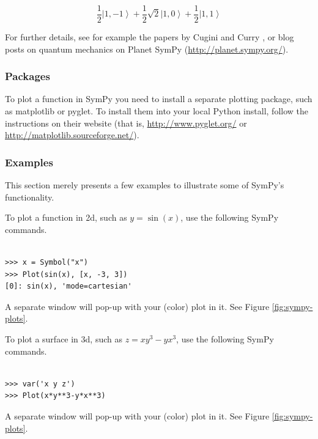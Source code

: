 \documentclass[12pt]{article}
\begin{document}
\[
\frac{1}{2} {\left|1,-1\right\rangle } + \frac{1}{2} \sqrt{2} {\left|1,0\right
\rangle } + \frac{1}{2} {\left|1,1\right\rangle }
\]

For further details, see for example the papers by Cugini \cite{Cug}
and Curry \cite{Cur}, or blog posts on quantum mechanics on 
Planet SymPy (\url{http://planet.sympy.org/}).

\subsubsection{Packages}

To plot a function in SymPy you need to install a separate plotting
package, such as matplotlib or pyglet.
To install them into your local Python install, follow the
instructions on their website (that is,
\url{http://www.pyglet.org/} or
\url{http://matplotlib.sourceforge.net/}).

\subsubsection{Examples}

This section merely presents a few examples to illustrate some of 
SymPy's functionality.

To plot a function in 2d, such as $y=\sin(x)$,
use the following SymPy commands.

\begin{Verbatim}[fontsize=\scriptsize,fontfamily=courier,fontshape=tt,frame=single,label=SymPy]

>>> x = Symbol("x")
>>> Plot(sin(x), [x, -3, 3])
[0]: sin(x), 'mode=cartesian'

\end{Verbatim}

\noindent
A separate window will pop-up with your (color) plot in it.
See Figure \ref{fig:sympy-plots}.

To plot a surface in 3d, such as $z=xy^3-yx^3$,
use the following SymPy commands.

\begin{Verbatim}[fontsize=\scriptsize,fontfamily=courier,fontshape=tt,frame=single,label=SymPy]

>>> var('x y z')
>>> Plot(x*y**3-y*x**3)

\end{Verbatim}

\noindent
A separate window will pop-up with your (color) plot in it.
See Figure \ref{fig:sympy-plots}.
\end{document}
